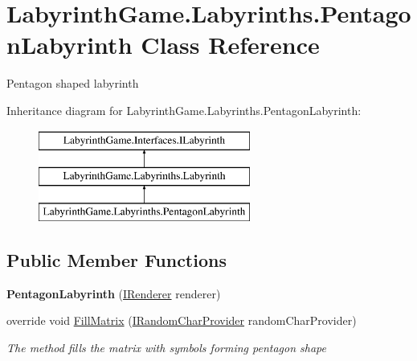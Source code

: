 \hypertarget{class_labyrinth_game_1_1_labyrinths_1_1_pentagon_labyrinth}{\section{Labyrinth\+Game.\+Labyrinths.\+Pentagon\+Labyrinth Class Reference}
\label{class_labyrinth_game_1_1_labyrinths_1_1_pentagon_labyrinth}
}


Pentagon shaped labyrinth  


Inheritance diagram for Labyrinth\+Game.\+Labyrinths.\+Pentagon\+Labyrinth\+:\begin{figure}[H]
\begin{center}
\leavevmode
\includegraphics[height=3.000000cm]{class_labyrinth_game_1_1_labyrinths_1_1_pentagon_labyrinth}
\end{center}
\end{figure}
\subsection*{Public Member Functions}
\begin{DoxyCompactItemize}
\item 
\hypertarget{class_labyrinth_game_1_1_labyrinths_1_1_pentagon_labyrinth_a67e8081b5bd87fb878c1570a84b9b631}{{\bfseries Pentagon\+Labyrinth} (\hyperlink{interface_labyrinth_game_1_1_interfaces_1_1_i_renderer}{I\+Renderer} renderer)}\label{class_labyrinth_game_1_1_labyrinths_1_1_pentagon_labyrinth_a67e8081b5bd87fb878c1570a84b9b631}

\item 
override void \hyperlink{class_labyrinth_game_1_1_labyrinths_1_1_pentagon_labyrinth_aa8e799ea6bf80cc6f78eb0d87fa20e93}{Fill\+Matrix} (\hyperlink{interface_labyrinth_game_1_1_interfaces_1_1_i_random_char_provider}{I\+Random\+Char\+Provider} random\+Char\+Provider)
\begin{DoxyCompactList}\small\item\em The method fills the matrix with symbols forming pentagon shape \end{DoxyCompactList}\end{DoxyCompactItemize}
